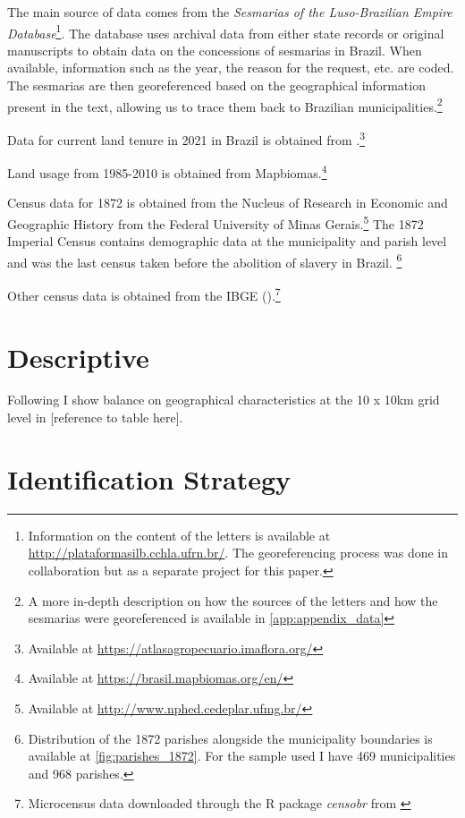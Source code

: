 \documentclass{article}
\begin{document}
The main source of data comes from the \textit{Sesmarias of the Luso-Brazilian Empire Database}\footnote{
  Information on the content of the letters is available at \url{http://plataformasilb.cchla.ufrn.br/}. The georeferencing process was done in collaboration but as a separate project for this paper.}.
The database uses archival data from either state records or original manuscripts to obtain data on the concessions of sesmarias in Brazil. 
When available, information such as the year, the reason for the request, etc. are coded. 
The sesmarias are then georeferenced based on the geographical information present in the text, allowing us to trace them back to Brazilian municipalities.\footnote{A more in-depth description on how the sources of the letters and how the sesmarias were georeferenced is available in \autoref{app:appendix_data}}

Data for current land tenure in 2021 in Brazil is obtained from \textcite{Sparovek2019-dn}.\footnote{
  Available at \url{https://atlasagropecuario.imaflora.org/}}

Land usage from 1985-2010 is obtained from Mapbiomas.\textcite{Souza2020-kb}\footnote{
  Available at \url{https://brasil.mapbiomas.org/en/}}

Census data for 1872 is obtained from the Nucleus of Research in Economic and Geographic History from the Federal University of Minas Gerais.\footnote{
  Available at \url{http://www.nphed.cedeplar.ufmg.br/}}
The 1872 Imperial Census contains demographic data at the municipality and parish level and was the last census taken before the abolition of slavery in Brazil. \footnote{Distribution of the 1872 parishes alongside the municipality boundaries is available at \autoref{fig:parishes_1872}. For the sample used I have 469 municipalities and 968 parishes.}

Other census data is obtained from the IBGE (\textit{}).\footnote{Microcensus data downloaded through the R package \textit{censobr} from \textcite{Pereira2023-qv}}

\section{Descriptive}

Following \textcite{Lowes2021-ww} I show balance on geographical characteristics at the 10 x 10km grid level in [reference to table here].

\section{Identification Strategy}
\end{document}
